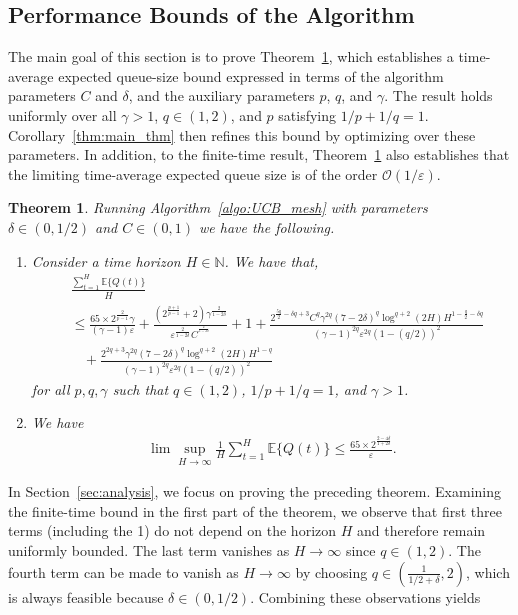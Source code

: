 \documentclass[12pt,draftcls, onecolumn]{IEEEtran}
\newtheorem{theorem}{Theorem}
\begin{document}
\subsection{Performance Bounds of the Algorithm}
The main goal of this section is to prove Theorem~\ref{thm:main_thm_bef_opt}, which establishes a time-average expected queue-size bound expressed in terms of the algorithm parameters $C$ and $\delta$, and the auxiliary parameters $p$, $q$, and $\gamma$. The result holds uniformly over all $\gamma > 1$, $q \in (1,2)$, and $p$ satisfying $1/p + 1/q = 1$. Corollary~\ref{thm:main_thm} then refines this bound by optimizing over these parameters. In addition, to the finite-time result, Theorem~\ref{thm:main_thm_bef_opt} also establishes that the limiting time-average expected queue size is of the order $\mathcal{O}(1/\varepsilon)$. 
\begin{theorem}\label{thm:main_thm_bef_opt}
     Running Algorithm~\ref{algo:UCB_mesh} with parameters $\delta \in (0,1/2)$ and $C \in (0,1)$ we have the following.
    \begin{enumerate}
        \item Consider a time horizon $H \in \mathbb{N}$. We have that,
    \begin{align}\label{eqn:llate_stage_2}
         &\frac{\sum_{t = 1}^H \mathbb{E}\{Q(t)\}}{H}\nonumber\\&\leq \frac{65\times2^{\frac{2}{p-1}}\gamma }{(\gamma-1) \varepsilon}+\frac{\left(2^{\frac{p+1}{p-1}}+2\right)\gamma^{\frac{2}{1-2\delta}}}{\varepsilon^{\frac{2}{1-2\delta}}C^{^{\frac{2}{1-2\delta}}}}+1 +\frac{2^{\frac{5q}{2}-\delta q+3}C^q\gamma^{2q}(7-2\delta)^q\log^{q+2}(2H)H^{1-\frac{q}{2}-\delta q}}{(\gamma-1)^{2q}\varepsilon^{2q}(1-(q/2))^2}  \nonumber\\&\ \ \ \ + \frac{2^{2q +3}\gamma^{2q}(7-2\delta)^q\log^{q+2}(2H)H^{1-q}}{(\gamma-1)^{2q}\varepsilon^{2q}(1-(q/2))^2}
    \end{align}
    for all $p,q,\gamma$ such that $q \in (1,2)$, $1/p+1/q = 1$, and $\gamma > 1$.
    \item We have
    \begin{align}\label{eqn:limit}
         \lim\sup_{H \to \infty}\frac{1}{H}\sum_{t = 1}^H \mathbb{E}\{Q(t)\} \leq  \frac{65\times 2^{\frac{2-4\delta}{1+2\delta}}}{\varepsilon}.
    \end{align}
   
    \end{enumerate}   
\end{theorem}
In Section~\ref{sec:analysis}, we focus on proving the preceding theorem. Examining the finite-time bound in the first part of the theorem, we observe that first three terms (including the 1) do not depend on the horizon $H$ and therefore remain uniformly bounded. The last term vanishes as $H \to \infty$ since $q \in (1,2)$. The fourth term can be made to vanish as $H \to \infty$ by choosing $q \in \left(\frac{1}{1/2+\delta},2\right)$, which is always feasible because $\delta \in (0,1/2)$. Combining these observations yields
\end{document}
